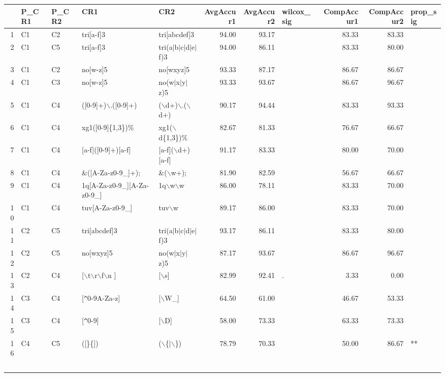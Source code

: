 \begin{table}[ht]
\centering
\begin{tabular}{rllllrrlrrl}
  \hline
 & P\_CR1 & P\_CR2 & CR1 & CR2 & AvgAccur1 & AvgAccur2 & wilcox\_sig & CompAccur1 & CompAccur2 & prop\_sig \\ 
  \hline
1 & C1 & C2 & tri[a-f]3 & tri[abcdef]3 & 94.00 & 93.17 &   & 83.33 & 83.33 &   \\ 
  2 & C1 & C5 & tri[a-f]3 & tri(a$|$b$|$c$|$d$|$e$|$f)3 & 94.00 & 86.11 &   & 83.33 & 80.00 &   \\ 
  3 & C1 & C2 & no[w-z]5 & no[wxyz]5 & 93.33 & 87.17 &   & 86.67 & 86.67 &   \\ 
  4 & C1 & C3 & no[w-z]5 & no(w$|$x$|$y$|$z)5 & 93.33 & 93.67 &   & 86.67 & 96.67 &   \\ 
  5 & C1 & C4 & ([0-9]+)$\backslash$.([0-9]+) & ($\backslash$d+)$\backslash$.($\backslash$d+) & 90.17 & 94.44 &   & 83.33 & 93.33 &   \\ 
  6 & C1 & C4 & xg1([0-9]\{1,3\})\% & xg1($\backslash$d\{1,3\})\% & 82.67 & 81.33 &   & 76.67 & 66.67 &   \\ 
  7 & C1 & C4 & [a-f]([0-9]+)[a-f] & [a-f]($\backslash$d+)[a-f] & 91.17 & 83.33 &   & 80.00 & 70.00 &   \\ 
  8 & C1 & C4 & \&([A-Za-z0-9\_]+); & \&($\backslash$w+); & 81.90 & 82.59 &   & 56.67 & 66.67 &   \\ 
  9 & C1 & C4 & 1q[A-Za-z0-9\_][A-Za-z0-9\_] & 1q$\backslash$w$\backslash$w & 86.00 & 78.11 &   & 83.33 & 70.00 &   \\ 
  10 & C1 & C4 & tuv[A-Za-z0-9\_] & tuv$\backslash$w & 89.17 & 86.00 &   & 83.33 & 70.00 &   \\ 
  11 & C2 & C5 & tri[abcdef]3 & tri(a$|$b$|$c$|$d$|$e$|$f)3 & 93.17 & 86.11 &   & 83.33 & 80.00 &   \\ 
  12 & C2 & C5 & no[wxyz]5 & no(w$|$x$|$y$|$z)5 & 87.17 & 93.67 &   & 86.67 & 96.67 &   \\ 
  13 & C2 & C4 & [$\backslash$t$\backslash$r$\backslash$f$\backslash$n ] & [$\backslash$s] & 82.99 & 92.41 & . & 3.33 & 0.00 &   \\ 
  14 & C3 & C4 & [\verb|^|0-9A-Za-z] & [$\backslash$W\_] & 64.50 & 61.00 &   & 46.67 & 53.33 &   \\ 
  15 & C3 & C4 & [\verb|^|0-9] & [$\backslash$D] & 58.00 & 73.33 &   & 63.33 & 73.33 &   \\ 
  16 & C4 & C5 & ([\}\{]) & ($\backslash$\{$|$$\backslash$\}) & 78.79 & 70.33 &   & 50.00 & 86.67 & ** \\ 
$$
\end{tabular}
\end{table}

